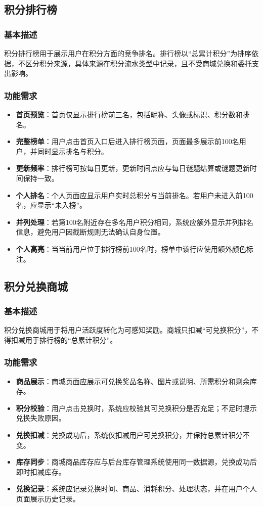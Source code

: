 \documentclass[a4paper,12pt]{article}
\begin{document}
\subsection{积分排行榜}

\subsubsection{基本描述}
积分排行榜用于展示用户在积分方面的竞争排名。排行榜以“总累计积分”为排序依据，不区分积分来源，具体来源在积分流水类型中记录，且不受商城兑换和委托支出影响。

\subsubsection{功能需求}
\begin{itemize}
    \item \textbf{首页预览}：首页仅显示排行榜前三名，包括昵称、头像或标识、积分数和排名。
    \item \textbf{完整榜单}：用户点击首页入口后进入排行榜页面，页面最多展示前100名用户，并同时显示排名与积分。
    \item \textbf{更新频率}：排行榜可按每日更新，更新时间点应与每日谜题结算或谜题更新时间保持一致。
    \item \textbf{个人排名}：个人页面应显示用户实时总积分与当前排名。若用户未进入前100名，应显示“未入榜”。
    \item \textbf{并列处理}：若第100名附近存在多名用户积分相同，系统应额外显示并列排名信息，避免用户因截断规则无法确认自身位置。
    \item \textbf{个人高亮}：当当前用户位于排行榜前100名时，榜单中该行应使用额外颜色标注。
\end{itemize}

\subsection{积分兑换商城}

\subsubsection{基本描述}
积分兑换商城用于将用户活跃度转化为可感知奖励。商城只扣减“可兑换积分”，不得扣减用于排行榜的“总累计积分”。

\subsubsection{功能需求}
\begin{itemize}
    \item \textbf{商品展示}：商城页面应展示可兑换奖品名称、图片或说明、所需积分和剩余库存。
    \item \textbf{积分校验}：用户点击兑换时，系统应校验其可兑换积分是否充足；不足时提示兑换失败原因。
    \item \textbf{兑换扣减}：兑换成功后，系统仅扣减用户可兑换积分，并保持总累计积分不变。
    \item \textbf{库存同步}：商城商品库存应与后台库存管理系统使用同一数据源，兑换成功后即时扣减库存。
    \item \textbf{兑换记录}：系统应记录兑换时间、商品、消耗积分、处理状态，并在用户个人页面展示历史记录。
\end{itemize}
\end{document}

